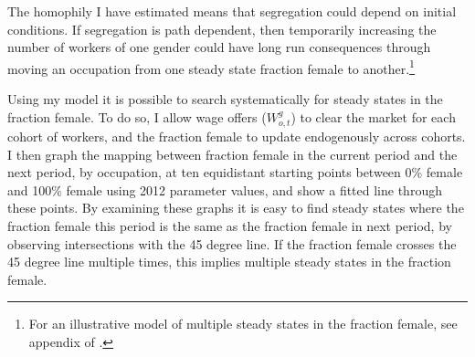 \documentclass[12pt]{article}
\begin{document}
The homophily I have estimated means that segregation could depend on initial conditions. If segregation is path dependent, then temporarily increasing the number of workers of one gender could have long run consequences through moving an occupation from one steady state fraction female to another.\footnote{For an illustrative model of multiple steady states in the fraction female, see appendix of .} 






Using my model it is possible to search systematically for steady states in the fraction female. To do so, I allow wage offers ($ W^{g}_{o,t}$) to clear the market for each cohort of workers, and the fraction female to update endogenously across cohorts. I then graph the mapping between fraction female in the current period and the next period, by occupation, at ten equidistant starting points between 0\% female and 100\% female using 2012 parameter values, and show a fitted line through these points. By examining these graphs it is easy to find steady states where the fraction female this period is the same as the fraction female in next period, by observing intersections with the 45 degree line. If the fraction female crosses the 45 degree line multiple times, this implies multiple steady states in the fraction female.

\end{document}
